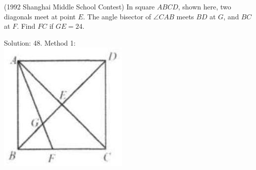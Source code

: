 \documentclass{article}
\begin{document}
(1992 Shanghai Middle School Contest) In square \(A B C D\), shown here, two diagonals meet at point \(E\). The angle bisector of \(\angle C A B\) meets \(B D\) at \(G\), and \(B C\) at \(F\). Find \(F C\) if \(G E=24\).

Solution: 48.
Method 1:\\
\centering
\includegraphics[width=\textwidth]{images/109(2).jpg}
\end{document}
